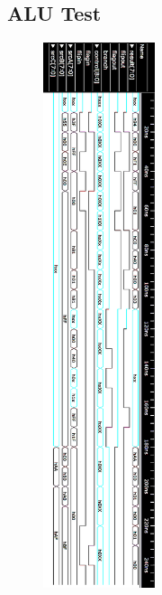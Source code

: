 \documentclass{article}
\begin{document}
    \subsection{ALU Test}
    \vspace{-15mm}
    \begin{figure}[H]
      \includegraphics[width=0.293\textwidth, right]{ALUTest.png}
    \end{figure}
    \newpage
\end{document}
